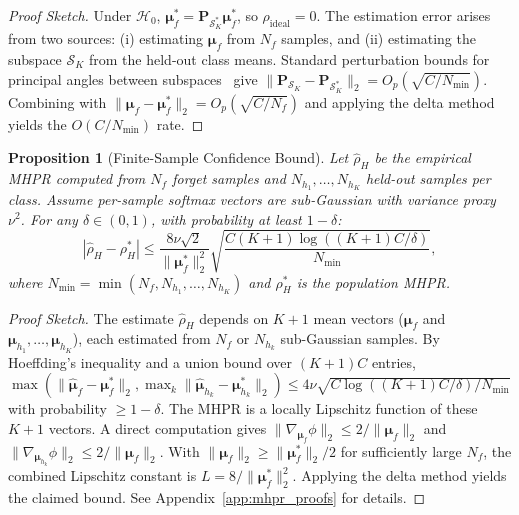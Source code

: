 \documentclass[journal]{IEEEtran}
\newtheorem{proposition}[theorem]{Proposition}
\theoremstyle{definition}
\begin{document}
\begin{proof}[Proof Sketch]
Under $\mathcal{H}_0$, $\boldsymbol{\mu}_f^* = \mathbf{P}_{\mathcal{S}_K^*}\boldsymbol{\mu}_f^*$, so $\rho_{\mathrm{ideal}} = 0$. The estimation error arises from two sources: (i) estimating $\boldsymbol{\mu}_f$ from $N_f$ samples, and (ii) estimating the subspace $\mathcal{S}_K$ from the held-out class means. Standard perturbation bounds for principal angles between subspaces~\cite{stewart1990matrix} give $\|\mathbf{P}_{\mathcal{S}_K} - \mathbf{P}_{\mathcal{S}_K^*}\|_2 = O_p(\sqrt{C/N_{\min}})$. Combining with $\|\boldsymbol{\mu}_f - \boldsymbol{\mu}_f^*\|_2 = O_p(\sqrt{C/N_f})$ and applying the delta method yields the $O(C/N_{\min})$ rate.
\end{proof}

\begin{proposition}[Finite-Sample Confidence Bound]
\label{prop:mhpr_confidence}
Let $\hat{\rho}_H$ be the empirical MHPR computed from $N_f$ forget samples and $N_{h_1},\dots,N_{h_K}$ held-out samples per class. Assume per-sample softmax vectors are sub-Gaussian with variance proxy $\nu^2$. For any $\delta \in (0,1)$, with probability at least $1-\delta$:
\begin{equation}
|\hat{\rho}_H - \rho_H^*| \le \frac{8\nu\sqrt{2}}{\|\boldsymbol{\mu}_f^*\|_2^2}\sqrt{\frac{C(K+1)\log((K+1)C/\delta)}{N_{\min}}},
\label{eq:mhpr_conf}
\end{equation}
where $N_{\min} = \min(N_f, N_{h_1},\dots,N_{h_K})$ and $\rho_H^*$ is the population MHPR.
\end{proposition}

\begin{proof}[Proof Sketch]
The estimate $\hat{\rho}_H$ depends on $K+1$ mean vectors ($\boldsymbol{\mu}_f$ and $\boldsymbol{\mu}_{h_1},\dots,\boldsymbol{\mu}_{h_K}$), each estimated from $N_f$ or $N_{h_k}$ sub-Gaussian samples. By Hoeffding's inequality and a union bound over $(K+1)C$ entries, $\max(\|\hat{\boldsymbol{\mu}}_f - \boldsymbol{\mu}_f^*\|_2, \max_k \|\hat{\boldsymbol{\mu}}_{h_k} - \boldsymbol{\mu}_{h_k}^*\|_2) \le 4\nu\sqrt{C\log((K+1)C/\delta)/N_{\min}}$ with probability $\ge 1-\delta$. The MHPR is a locally Lipschitz function of these $K+1$ vectors. A direct computation gives $\|\nabla_{\boldsymbol{\mu}_f}\phi\|_2 \le 2/\|\boldsymbol{\mu}_f\|_2$ and $\|\nabla_{\boldsymbol{\mu}_{h_k}}\phi\|_2 \le 2/\|\boldsymbol{\mu}_f\|_2$. With $\|\boldsymbol{\mu}_f\|_2 \ge \|\boldsymbol{\mu}_f^*\|_2/2$ for sufficiently large $N_f$, the combined Lipschitz constant is $L = 8/\|\boldsymbol{\mu}_f^*\|_2^2$. Applying the delta method yields the claimed bound. See Appendix~\ref{app:mhpr_proofs} for details.
\end{proof}
\end{document}
